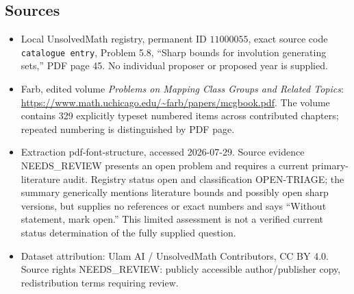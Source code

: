 \documentclass[11pt]{article}
\begin{document}
\subsection{Sources}
\begin{itemize}
\item Local UnsolvedMath registry, permanent ID \(11000055\), exact source code \texttt{catalogue entry}, Problem 5.8, ``Sharp bounds for involution generating sets,'' PDF page 45. No individual proposer or proposed year is supplied.
\item Farb, edited volume \emph{Problems on Mapping Class Groups and Related Topics}: \url{https://www.math.uchicago.edu/~farb/papers/mcgbook.pdf}. The volume contains 329 explicitly typeset numbered items across contributed chapters; repeated numbering is distinguished by PDF page.
\item Extraction pdf-font-structure, accessed 2026-07-29. Source evidence NEEDS\_REVIEW presents an open problem and requires a current primary-literature audit. Registry status open and classification OPEN-TRIAGE; the summary generically mentions literature bounds and possibly open sharp versions, but supplies no references or exact numbers and says ``Without statement, mark open.'' This limited assessment is not a verified current status determination of the fully supplied question.
\item Dataset attribution: Ulam AI / UnsolvedMath Contributors, CC BY 4.0. Source rights NEEDS\_REVIEW: publicly accessible author/publisher copy, redistribution terms requiring review.
\end{itemize}
\end{document}
